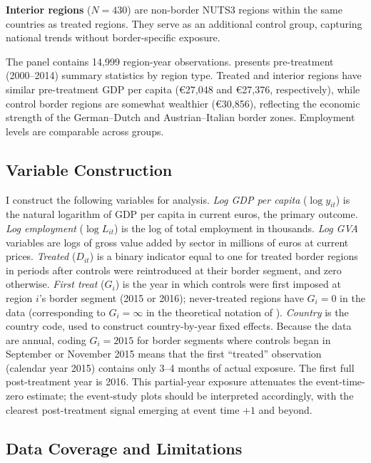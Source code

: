 \documentclass[12pt]{article}
\begin{document}
\textbf{Interior regions} ($N = 430$) are non-border NUTS3 regions within the same countries as treated regions. They serve as an additional control group, capturing national trends without border-specific exposure.

The panel contains 14,999 region-year observations.  presents pre-treatment (2000--2014) summary statistics by region type. Treated and interior regions have similar pre-treatment GDP per capita (\euro{}27,048 and \euro{}27,376, respectively), while control border regions are somewhat wealthier (\euro{}30,856), reflecting the economic strength of the German--Dutch and Austrian--Italian border zones. Employment levels are comparable across groups.



\subsection{Variable Construction}

I construct the following variables for analysis. \textit{Log GDP per capita} ($\log y_{it}$) is the natural logarithm of GDP per capita in current euros, the primary outcome. \textit{Log employment} ($\log L_{it}$) is the log of total employment in thousands. \textit{Log GVA} variables are logs of gross value added by sector in millions of euros at current prices. \textit{Treated} ($D_{it}$) is a binary indicator equal to one for treated border regions in periods after controls were reintroduced at their border segment, and zero otherwise. \textit{First treat} ($G_i$) is the year in which controls were first imposed at region $i$'s border segment (2015 or 2016); never-treated regions have $G_i = 0$ in the data (corresponding to $G_i = \infty$ in the theoretical notation of \citealt{CallawayS2021}). \textit{Country} is the country code, used to construct country-by-year fixed effects. Because the data are annual, coding $G_i = 2015$ for border segments where controls began in September or November 2015 means that the first ``treated'' observation (calendar year 2015) contains only 3--4 months of actual exposure. The first full post-treatment year is 2016. This partial-year exposure attenuates the event-time-zero estimate; the event-study plots should be interpreted accordingly, with the clearest post-treatment signal emerging at event time $+1$ and beyond.

\subsection{Data Coverage and Limitations}
\end{document}
